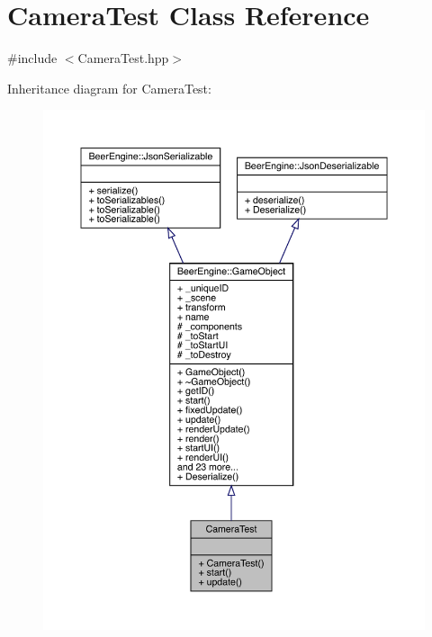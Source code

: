 \hypertarget{class_camera_test}{}\section{Camera\+Test Class Reference}
\label{class_camera_test}


{\ttfamily \#include $<$Camera\+Test.\+hpp$>$}



Inheritance diagram for Camera\+Test\+:\nopagebreak
\begin{figure}[H]
\begin{center}
\leavevmode
\includegraphics[width=350pt]{class_camera_test__inherit__graph}
\end{center}
\end{figure}


